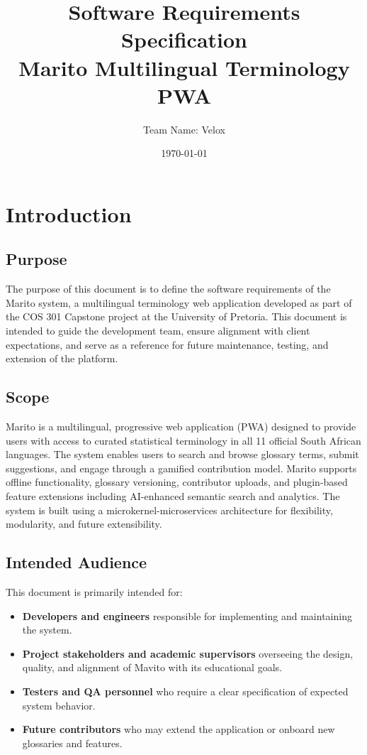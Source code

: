 \documentclass[12pt]{article}
\title{Software Requirements Specification\\\large\textbf{Marito Multilingual Terminology PWA}}
\author{Team Name: Velox}
\date{\today}
\begin{document}
\maketitle
\tableofcontents
\newpage

\section{Introduction}
\subsection{Purpose}
The purpose of this document is to define the software requirements of the Marito system, a multilingual terminology web application developed as part of the COS 301 Capstone project at the University of Pretoria. This document is intended to guide the development team, ensure alignment with client expectations, and serve as a reference for future maintenance, testing, and extension of the platform.

\subsection{Scope}
Marito is a multilingual, progressive web application (PWA) designed to provide users with access to curated statistical terminology in all 11 official South African languages. The system enables users to search and browse glossary terms, submit suggestions, and engage through a gamified contribution model. Marito supports offline functionality, glossary versioning, contributor uploads, and plugin-based feature extensions including AI-enhanced semantic search and analytics. The system is built using a microkernel-microservices architecture for flexibility, modularity, and future extensibility.

\subsection{Intended Audience}
This document is primarily intended for:
\begin{itemize}
    \item \textbf{Developers and engineers} responsible for implementing and maintaining the system.
    \item \textbf{Project stakeholders and academic supervisors} overseeing the design, quality, and alignment of Mavito with its educational goals.
    \item \textbf{Testers and QA personnel} who require a clear specification of expected system behavior.
    \item \textbf{Future contributors} who may extend the application or onboard new glossaries and features.
\end{itemize}
\end{document}
